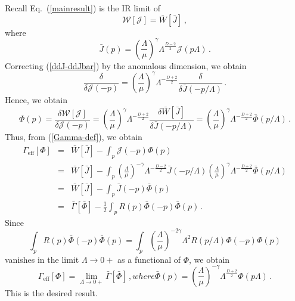\documentclass[aps,prd,preprint,groupedaddress,preprintnumbers,longbibliography]{revtex4-1}
\newcommand{\nn}{\nonumber}
\newcommand{\WW}{\mathcal{W}}
\newcommand{\JJ}{\mathcal{J}}
\begin{document}
Recall Eq.~(\ref{mainresult}) is the IR limit of
\begin{equation}
\WW [\JJ] = \bar{W} [ \bar{J} ]\,,\label{mainresult-nonzeroL}
\end{equation}
where
\begin{equation}
\bar{J} (p) = \left(\frac{\Lambda}{\mu}\right)^\gamma
\Lambda^{\frac{D-2}{2}} \JJ (p \Lambda)\,.
\end{equation}
Correcting (\ref{ddJ-ddJbar}) by the anomalous dimension, we obtain
\begin{equation}
\frac{\delta}{\delta \JJ (-p)} =
\left(\frac{\Lambda}{\mu}\right)^\gamma \Lambda^{-\frac{D+2}{2}}
\frac{\delta}{\delta \bar{J} (-p/\Lambda)}\,.
\end{equation}
Hence, we obtain
\begin{equation}
\Phi (p) = \frac{\delta \WW [\JJ]}{\delta \JJ (-p)} 
= \left(\frac{\Lambda}{\mu}\right)^\gamma \Lambda^{-\frac{D+2}{2}}
\frac{\delta \bar{W}[\bar{J}]}{\delta \bar{J} (-p/\Lambda)}
= \left(\frac{\Lambda}{\mu}\right)^\gamma \Lambda^{-\frac{D+2}{2}}
\bar{\Phi} (p/\Lambda)\,.
\end{equation}
Thus, from (\ref{Gamma-def}), we obtain
\begin{eqnarray}
\Gamma_{\mathrm{eff}} [\Phi] &=& \bar{W} [\bar{J}] - \int_p \JJ (-p)
\Phi (p)\nn\\ &=& \bar{W} [\bar{J}] - \int_p
\left(\frac{\Lambda}{\mu}\right)^{-\gamma} \Lambda^{-\frac{D-2}{2}}
\bar{J} (-p/\Lambda) \left(\frac{\Lambda}{\mu}\right)^{\gamma}
\Lambda^{-\frac{D+2}{2}} \bar{\Phi} (p/\Lambda) \nn\\
&=& \bar{W} [\bar{J}] - \int_p \bar{J} (-p) \bar{\Phi} (p)\nn\\
&=& \bar{\Gamma}[\bar{\Phi}] - \frac{1}{2} \int_p R(p) \bar{\Phi} (-p)
\bar{\Phi} (p)\,.
\end{eqnarray}
Since
\begin{equation}
\int_p R(p) \bar{\Phi} (-p) \bar{\Phi} (p) = \int_p
\left(\frac{\Lambda}{\mu}\right)^{-2\gamma} \Lambda^2 R(p/\Lambda)
\Phi (-p) \Phi (p)
\end{equation}
vanishes in the limit $\Lambda \to 0+$ as a functional of $\Phi$, we
obtain
\begin{subequations}
\begin{equation}
\Gamma_{\mathrm{eff}} [\Phi] = \lim_{\Lambda \to 0+} \bar{\Gamma} [\bar{\Phi}]\,,
\end{equation}
where
\begin{equation}
\bar{\Phi} (p) = \left(\frac{\Lambda}{\mu}\right)^{-\gamma}
\Lambda^{\frac{D+2}{2}} \Phi (p \Lambda)\,.
\end{equation}
\end{subequations}
This is the desired result.
\end{document}

